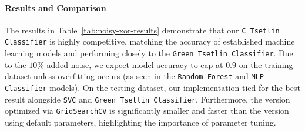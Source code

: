\documentclass[english]{aghengthesis} %
\begin{document}
\paragraph{Results and Comparison}
The results in Table~\ref{tab:noisy-xor-results} demonstrate that our \texttt{C Tsetlin Classifier} is highly competitive, matching the accuracy of established machine learning models and performing closely to the \texttt{Green Tsetlin Classifier}. Due to the $10\%$ added noise, we expect model accuracy to cap at $0.9$ on the training dataset unless overfitting occurs (as seen in the \texttt{Random Forest} and \texttt{MLP Classifier} models). On the testing dataset, our implementation tied for the best result alongside \texttt{SVC} and \texttt{Green Tsetlin Classifier}. Furthermore, the version optimized via \texttt{GridSearchCV} is significantly smaller and faster than the version using default parameters, highlighting the importance of parameter tuning.
\end{document}
